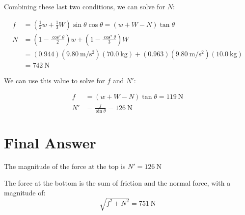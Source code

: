 \documentclass{article}
\begin{document}
Combining these last two conditions, we can solve for $N$:

\begin{align*}
    f &= \left(\frac{1}{2}w + \frac{1}{3}W\right)\sin \theta \cos \theta = (w + W - N)\tan \theta \\
    N &= \left(1 - \frac{\cos^2 \theta}{2}\right)w + \left(1 - \frac{\cos^2 \theta}{3}\right)W \\
    &= (0.944)(\SI{9.80}{\meter\per\second\squared})(\SI{70.0}{\kilogram}) + (0.963)(\SI{9.80}{\meter\per\second\squared})(\SI{10.0}{\kilogram}) \\
    &= \SI{742}{\newton}
\end{align*}

We can use this value to solve for $f$ and $N'$:

\begin{align*}
    f &= (w + W - N)\tan \theta = \SI{119}{\newton} \\
    N' &= \frac{f}{\sin \theta} = \SI{126}{\newton}
\end{align*}

\section*{Final Answer}
The magnitude of the force at the top is $N' = \boxed{\SI{126}{\newton}}$

The force at the bottom is the sum of friction and the normal force, with a magnitude of:
\[\sqrt{f^2 + N^2} = \boxed{\SI{751}{\newton}}\]
\end{document}
